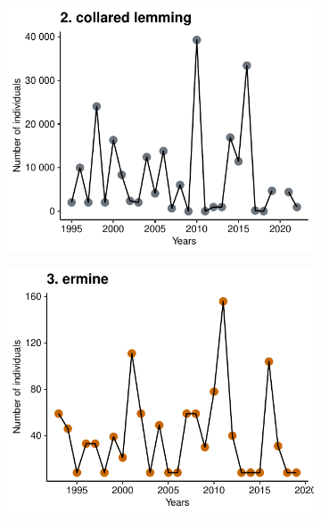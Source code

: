 \documentclass[a4paper,twoside,10pt]{article}
\begin{document}
\begin{figure}[h]
\begin{subfigure}{0.45\textwidth}
    \includegraphics[width=\linewidth]{figures/species_temporal_series/collared_lemming.pdf}
  \end{subfigure}
  \begin{subfigure}{0.45\textwidth}
    \includegraphics[width=\linewidth]{figures/species_temporal_series/ermine.pdf}
  \end{subfigure}
\end{figure}
\newpage
\end{document}

